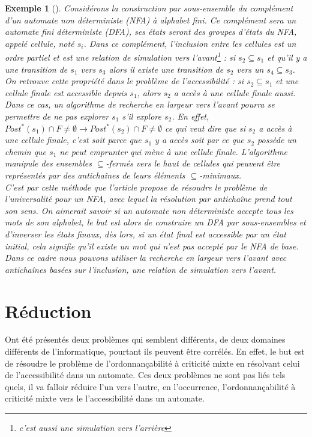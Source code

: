 \documentclass[a4paper]{report}
\theoremstyle{break}
\newtheorem{exem}{Exemple}
\theoremstyle{breakplain}
\begin{document}
\begin{exem}[\cite{doyen2010antichain}]
Considérons la construction par sous-ensemble du complément d'un automate non déterministe (NFA) à alphabet fini. Ce complément sera un automate fini déterministe (DFA), ses états seront des groupes d'états du NFA, appelé cellule, noté $s_i$. Dans ce complément, l'inclusion entre les cellules est un ordre partiel et est une relation de simulation vers l'avant\footnote{c'est aussi une simulation vers l'arrière} : si $s_2 \subseteq s_1$ et qu'il y a une transition de $s_1$ vers $s_3$ alors il existe une transition de $s_2$ vers un $s_4 \subseteq s_3$. On retrouve cette propriété dans le problème de l'accessibilité : si $s_2 \subseteq s_1$ et une cellule finale est accessible depuis $s_1$, alors $s_2$ a accès à une cellule finale aussi. Dans ce cas, un algorithme de recherche en largeur vers l'avant pourra se permettre de ne pas explorer $s_1$ s'il explore $s_2$. En effet, $Post^*(s_1) \cap F \neq \emptyset \rightarrow Post^*(s_2) \cap F \neq \emptyset$ ce qui veut dire que si $s_2$ a accès à une cellule finale, c'est soit parce que $s_1$ y a accès soit par ce que $s_2$ possède un chemin que $s_1$ ne peut emprunter qui mène à une cellule finale. L'algorithme manipule des ensembles $\subseteq$-fermés vers le haut de cellules qui peuvent être représentés par des antichaînes de leurs éléments $\subseteq$-minimaux.\\

C'est par cette méthode que l'article \cite{doyen2010antichain} propose de résoudre le problème de l'universalité pour un NFA, avec lequel la résolution par antichaîne prend tout son sens. On aimerait savoir si un automate non déterministe accepte tous les mots de son alphabet, le but est alors de construire un DFA par sous-ensembles et d'inverser les états finaux, dès lors, si un état final est accessible par un état initial, cela signifie qu'il existe un mot qui n'est pas accepté par le NFA de base. Dans ce cadre nous pouvons utiliser la recherche en largeur vers l’avant avec antichaînes basées sur l'inclusion, une relation de simulation vers l'avant.
\end{exem}

\section{Réduction}
Ont été présentés deux problèmes qui semblent différents, de deux domaines différents de l'informatique, pourtant ils peuvent être corrélés. En effet, le but est de résoudre le problème de l'ordonnançabilité à criticité mixte en résolvant celui de l'accessibilité dans un automate. Ces deux problèmes ne sont pas liés tels quels, il va falloir réduire l'un vers l'autre, en l'occurrence, l'ordonnançabilité à criticité mixte vers le l'accessibilité dans un automate.\\
\end{document}
